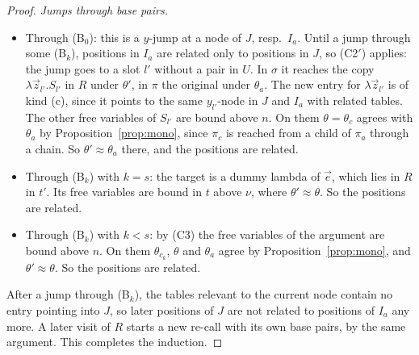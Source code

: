 \documentclass[11pt]{article}
\theoremstyle{plain}
\theoremstyle{definition}
\theoremstyle{remark}
\begin{document}
\begin{proof}
\emph{Jumps through base pairs.}
\begin{itemize}
\item Through (B$_0$): this is a $y$-jump at a node of $J$, resp.\
  $I_a$.  Until a jump through some (B$_k$), positions in $I_a$ are
  related only to positions in $J$, so (C2$'$) applies: the jump goes to
  a slot $l'$ without a pair in $U$.  In $\sigma$ it reaches the copy
  $\lambda\vec z_{l'}.S_{l'}$ in $R$ under $\theta'$, in $\pi$ the original
  under $\theta_a$.  The new entry for $\lambda\vec z_{l'}$ is of kind (c),
  since it points to the same $y_{l'}$-node in $J$ and $I_a$ with related
  tables.  The other free variables of $S_{l'}$ are bound above $n$.  On
  them $\theta=\theta_c$ agrees with $\theta_a$ by
  Proposition~\ref{prop:mono}, since $\pi_c$ is reached from a child of
  $\pi_a$ through a chain.  So $\theta'\approx\theta_a$ there, and the
  positions are related.
\item Through (B$_k$) with $k=s$: the target is a dummy lambda of
  $\vec e$, which lies in $R$ in $t'$.  Its free variables are bound in
  $t$ above $\nu$, where $\theta'\approx\theta$.  So the positions are
  related.
\item Through (B$_k$) with $k<s$: by (C3) the free variables of the
  argument are bound above $n$.  On them $\theta_{c_k}$, $\theta$ and
  $\theta_a$ agree by Proposition~\ref{prop:mono}, and
  $\theta'\approx\theta$.  So the positions are related.
\end{itemize}
After a jump through (B$_k$), the tables relevant to the current node
contain no entry pointing into $J$, so later positions of $J$ are not
related to positions of $I_a$ any more.  A later visit of $R$ starts a
new re-call with its own base pairs, by the same argument.  This
completes the induction.
\end{proof}
\end{document}
